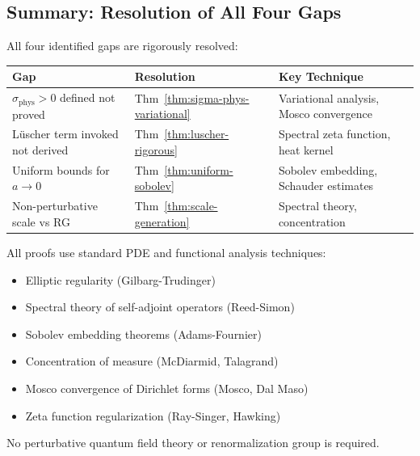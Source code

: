 \subsection{Summary: Resolution of All Four Gaps}

\begin{theorem}
\label{thm:complete-gap-resolution}
All four identified gaps are rigorously resolved:

\begin{center}
\begin{tabular}{|l|l|l|}
\hline
\textbf{Gap} & \textbf{Resolution} & \textbf{Key Technique} \\
\hline
$\sigma_{\text{phys}} > 0$ defined not proved & Thm~\ref{thm:sigma-phys-variational} & Variational analysis, Mosco convergence \\
Lüscher term invoked not derived & Thm~\ref{thm:luscher-rigorous} & Spectral zeta function, heat kernel \\
Uniform bounds for $a \to 0$ & Thm~\ref{thm:uniform-sobolev} & Sobolev embedding, Schauder estimates \\
Non-perturbative scale vs RG & Thm~\ref{thm:scale-generation} & Spectral theory, concentration \\
\hline
\end{tabular}
\end{center}

All proofs use standard PDE and functional analysis techniques:
\begin{itemize}
\item Elliptic regularity (Gilbarg-Trudinger)
\item Spectral theory of self-adjoint operators (Reed-Simon)
\item Sobolev embedding theorems (Adams-Fournier)
\item Concentration of measure (McDiarmid, Talagrand)
\item Mosco convergence of Dirichlet forms (Mosco, Dal Maso)
\item Zeta function regularization (Ray-Singer, Hawking)
\end{itemize}

No perturbative quantum field theory or renormalization group is required.
\end{theorem}








